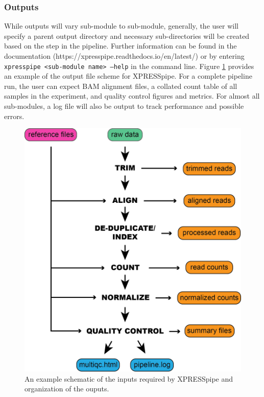 \documentclass[11pt, a4paper, oneside]{article}
\begin{document}
\subsubsection{Outputs}
While outputs will vary sub-module to sub-module, generally, the user will specify a parent output directory and necessary sub-directories will be created based on the step in the pipeline. Further information can be found in the documentation (https://xpresspipe.readthedocs.io/en/latest/) or by entering \texttt{xpresspipe \textless sub-module name\textgreater \ --help} in the command line. Figure \ref{fig:outputs} provides an example of the output file scheme for XPRESSpipe. For a complete pipeline run, the user can expect BAM alignment files, a collated count table of all samples in the experiment, and quality control figures and metrics. For almost all sub-modules, a log file will also be output to track performance and possible errors.

\begin{figure}
\centering
  \includegraphics[width=120mm]{figures/xpresspipe_overview.png}
  \caption{An example schematic of the inputs required by XPRESSpipe and organization of the ouputs.}
  \label{fig:outputs}
\end{figure}
\end{document}
